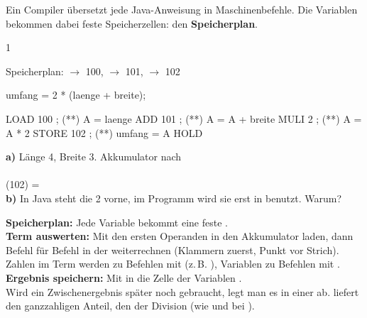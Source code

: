 \documentclass[11pt,a4paper]{article}
\begin{document}

Ein Compiler übersetzt jede Java-Anweisung in Maschinenbefehle. Die Variablen bekommen dabei feste Speicherzellen:
den \textbf{Speicherplan}.

\begin{aufgabe}{1}
\begin{minipage}[t]{0.47\linewidth}
\vspace{0pt}
Speicherplan:  $\to$ 100,  $\to$ 101,  $\to$ 102
\begin{java}[aboveskip=1mm]
umfang = 2 * (laenge + breite);
\end{java}
\begin{asm}[aboveskip=1mm]
LOAD 100     ; (**) A = laenge
ADD 101      ; (**) A = A + breite
MULI 2       ; (**) A = A * 2
STORE 102    ; (**) umfang = A
HOLD
\end{asm}
\end{minipage}\hfill
\begin{minipage}[t]{0.49\linewidth}
\vspace{0pt}\lueckentext
\textbf{a)} Länge 4, Breite 3. Akkumulator nach\\
     \\
  \quad (102) = \\
\textbf{b)} In Java steht die 2 vorne, im Programm wird sie erst in  benutzt. Warum?
\end{minipage}
\end{aufgabe}

\begin{merke}
\lueckentext
{} \textbf{Speicherplan:} Jede Variable bekommt eine feste .\\
 \textbf{Term auswerten:} Mit  den ersten Operanden in den Akkumulator laden, dann Befehl für Befehl
in der  weiterrechnen (Klammern zuerst, Punkt vor Strich).
Zahlen im Term werden zu Befehlen mit  (z.\,B. ), Variablen zu Befehlen mit .\\
 \textbf{Ergebnis speichern:} Mit  in die Zelle der Variablen .\\
Wird ein Zwischenergebnis später noch gebraucht, legt man es in einer  ab.
 liefert den ganzzahligen Anteil,  den  der Division (wie \code{/} und \code{\%} bei ).
\end{merke}
\end{document}
